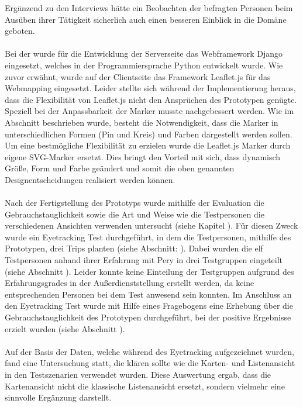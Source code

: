 \documentclass[Bachelorarbeit.tex]{subfiles}
\begin{document}
Ergänzend zu den Interviews hätte ein Beobachten der befragten Personen beim Ausüben ihrer Tätigkeit sicherlich auch einen besseren Einblick in die Domäne geboten.\\
\\
Bei der  wurde für die Entwicklung der Serverseite  das Webframework Django eingesetzt, welches in der Programmiersprache Python entwickelt wurde. 
Wie zuvor erwähnt, wurde auf der Clientseite das Framework Leaflet.js für das Webmapping eingesetzt.
Leider stellte sich während der Implementierung heraus, dass die Flexibilität von Leaflet.js nicht den Ansprüchen des Prototypen genügte.
Speziell bei der Anpassbarkeit der Marker musste nachgebessert werden. 
Wie im Abschnitt  beschrieben wurde, besteht die Notwendigkeit, dass die Marker in unterschiedlichen Formen (Pin und Kreis) und Farben dargestellt werden sollen.
Um eine bestmögliche Flexibilität zu erzielen wurde die Leaflet.js Marker durch  
eigene \ac{SVG}-Marker ersetzt.
Dies bringt den Vorteil mit sich, dass dynamisch Größe, Form und Farbe geändert und somit die oben genannten Designentscheidungen realisiert werden können.\\
\\
Nach der Fertigstellung des Prototyps wurde mithilfe der Evaluation die Gebrauchstauglichkeit sowie die Art und Weise wie die Testpersonen die verschiedenen Ansichten verwenden untersucht (siehe Kapitel ).  
Für diesen Zweck wurde ein Eyetracking Test durchgeführt, in dem die Testpersonen, mithilfe des Prototypen, drei Trips planten (siehe Abschnitt: ). 
Dabei wurden die elf Testpersonen anhand ihrer Erfahrung mit Pery in drei Testgruppen eingeteilt (siehe Abschnitt ). 
Leider konnte keine Einteilung der Testgruppen aufgrund des Erfahrungsgrades in der Außerdienststellung erstellt werden, da keine entsprechenden Personen bei dem Test anwesend sein konnten.
Im Anschluss an den Eyetracking Test wurde mit Hilfe eines Fragebogens eine Erhebung über die Gebrauchstauglichkeit des Prototypen durchgeführt, bei der positive Ergebnisse erzielt wurden (siehe Abschnitt ). \\
\\
Auf der Basis der Daten, welche während des Eyetracking aufgezeichnet wurden, fand eine Untersuchung statt, die klären sollte wie die Karten- und Listenansicht in den Testszenarien verwendet wurden.
Diese Auswertung ergab, dass die Kartenansicht nicht die klassische Listenansicht ersetzt, sondern vielmehr eine sinnvolle Ergänzung darstellt.
\end{document}
